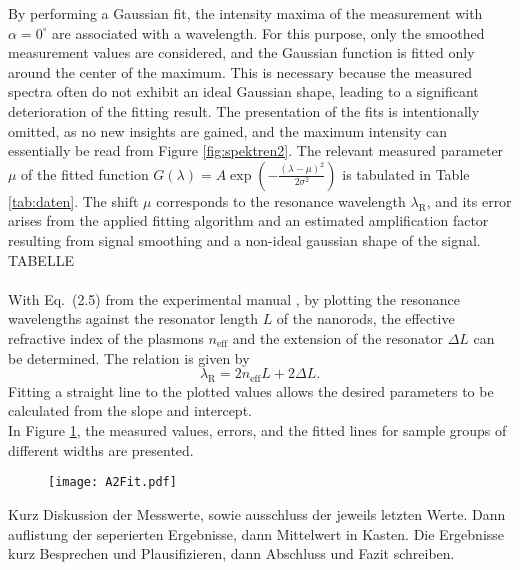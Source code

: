 By performing a Gaussian fit, the intensity maxima of the measurement with $\alpha = 0^{\circ}$ are 
associated with a wavelength. For this purpose, only the smoothed measurement values are considered, 
and the Gaussian function is fitted only around the center of the maximum. 
This is necessary because the measured spectra often do not exhibit an ideal Gaussian shape, 
leading to a significant deterioration of the fitting result. The presentation of the fits is 
intentionally omitted, as no new insights are gained, and the maximum intensity can essentially 
be read from Figure \ref{fig:spektren2}. 
The relevant measured parameter $\mu$ of the 
fitted function $G(\lambda) = A\exp\left(-\frac{(\lambda-\mu)^{2}}{2\sigma^{2}}\right)$ is tabulated 
in Table \ref{tab:daten}. 
The shift $\mu$ corresponds to the resonance wavelength $\lambda_{\text{R}}$, and its error arises from
the applied fitting algorithm and an estimated amplification factor 
resulting from signal smoothing and a non-ideal gaussian shape of the signal. \\
TABELLE \\ \\

With Eq.~(2.5) from the experimental manual \cite{Anleitung}, 
by plotting the resonance wavelengths against the resonator length $L$ of the nanorods, 
the effective refractive index of the plasmons $n_{\text{eff}}$ and the extension of the 
resonator $\Delta{L}$ can be determined. The relation is given by
\begin{equation}
    \lambda_{\text{R}} = 2n_{\text{eff}}L + 2\Delta{L}.
\end{equation}
Fitting a straight line to the plotted values allows the desired parameters 
to be calculated from the slope and intercept. \\
In Figure \ref{fig:lin}, the measured values, errors, and the fitted lines for sample 
groups of different widths are presented.
\begin{figure}[h!]
    \centering
    \texttt{[image: A2Fit.pdf]}
    \caption{\label{fig:lin}}
\end{figure}\FloatBarrier

Kurz Diskussion der Messwerte, sowie ausschluss der jeweils letzten Werte. 
Dann auflistung der seperierten Ergebnisse, dann Mittelwert in Kasten. 
Die Ergebnisse kurz Besprechen und Plausifizieren, dann 
Abschluss und Fazit schreiben. 








